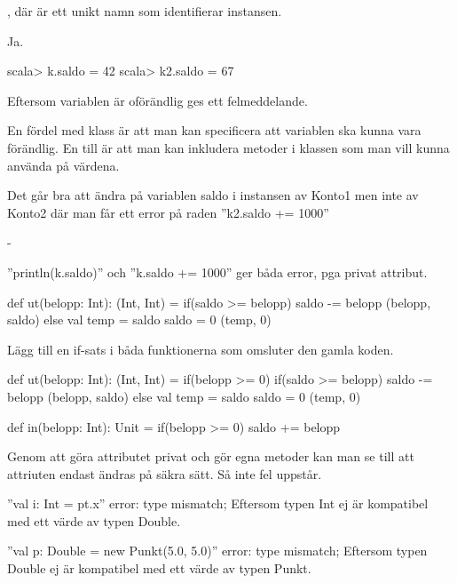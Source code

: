 \Task %

\Subtask  {}, där  är ett unikt namn som identifierar instansen.

\Subtask  Ja.

\Subtask  
\begin{REPLnonum}
scala> k.saldo = 42
scala> k2.saldo = 67
\end{REPLnonum}

\Subtask  Eftersom variablen är oförändlig ges ett felmeddelande.

\Subtask  En fördel med klass är att man kan specificera att variablen ska kunna vara förändlig. En till är att man kan inkludera metoder i klassen som man vill kunna använda på värdena.

\Task %

\Subtask 
Det går bra att ändra på variablen saldo i instansen av Konto1 men inte av Konto2 där man får ett error på raden ''k2.saldo += 1000''

\Subtask -

\Subtask 
''println(k.saldo)'' och ''k.saldo += 1000'' ger båda error, pga privat attribut.

\Subtask 
\begin{Code}
def ut(belopp: Int): (Int, Int) = {
	if(saldo >= belopp) {
		saldo -= belopp
		(belopp, saldo)
	} else {
		val temp = saldo
		saldo = 0
		(temp, 0)
	}
}
\end{Code}

\Subtask 
Lägg till en if-sats i båda funktionerna som omsluter den gamla koden.
\begin{Code}
def ut(belopp: Int): (Int, Int) = {
  if(belopp >= 0) {
    if(saldo >= belopp) {
      saldo -= belopp
      (belopp, saldo)
    } else {
      val temp = saldo
      saldo = 0
      (temp, 0)
    }
  }
}

def in(belopp: Int): Unit = {
  if(belopp >= 0) {
    saldo += belopp 
  }
}
\end{Code}

\Subtask 
Genom att göra attributet privat och gör egna metoder kan man se till att attriuten endast ändras på säkra sätt. Så inte fel uppstår.

\Task %

\Subtask 
''val i: Int = pt.x'' error: type mismatch;
Eftersom typen Int ej är kompatibel med ett värde av typen Double.

''val p: Double = new Punkt(5.0, 5.0)'' error: type mismatch;
Eftersom typen Double ej är kompatibel med ett värde av typen Punkt.

